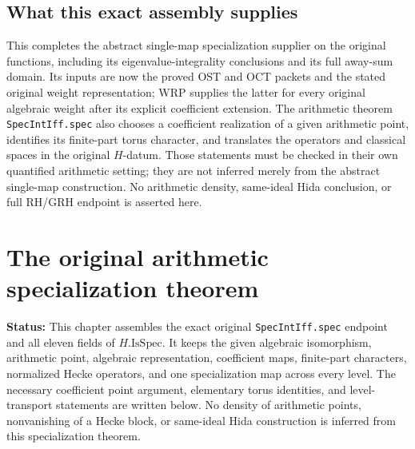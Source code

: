 \documentclass[11pt,a4paper]{article}
\numberwithin{equation}{section}
\theoremstyle{remark}\newtheorem{remark}[theorem]{Remark}
\newcommand{\status}[1]{\textbf{Status:} #1}
\begin{document}
\subsection{What this exact assembly supplies}

This completes the abstract single-map specialization
supplier on the original functions, including its
eigenvalue-integrality conclusions and its full away-sum
domain.  Its inputs are now the proved OST and OCT
packets and the stated original weight representation;
WRP supplies the latter for every original algebraic
weight after its explicit coefficient extension.
The arithmetic theorem \texttt{Spec\allowbreak Int\allowbreak Iff.\allowbreak spec} also
chooses a coefficient realization of a given arithmetic
point, identifies its finite-part torus character,
and translates the operators and classical spaces in
the original $H$-datum.  Those statements must be
checked in their own quantified arithmetic setting;
they are not inferred merely from the abstract
single-map construction.  No arithmetic density,
same-ideal Hida conclusion, or full RH/GRH endpoint
is asserted here.


\section{The original arithmetic specialization theorem}
\label{sec:arithmetic-specialization-v42}

\status{This chapter assembles the exact original
\texttt{Spec\allowbreak Int\allowbreak Iff.\allowbreak spec} endpoint and all eleven fields of
$H.\mathrm{IsSpec}$.  It keeps the given algebraic isomorphism,
arithmetic point, algebraic representation, coefficient maps,
finite-part characters, normalized Hecke operators, and one
specialization map across every level.  The necessary coefficient
point argument, elementary torus identities, and level-transport
statements are written below.  No density of arithmetic points,
nonvanishing of a Hecke block, or same-ideal Hida construction
is inferred from this specialization theorem.}
\end{document}
